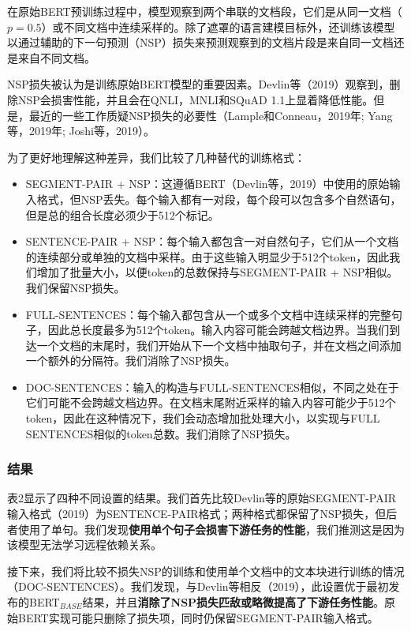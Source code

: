 \documentclass[lang=cn,11pt,a4paper,twocolumn]{elegantpaper}
\begin{document}
在原始BERT预训练过程中，模型观察到两个串联的文档段，它们是从同一文档（
$p = 0.5$）或不同文档中连续采样的。除了遮罩的语言建模目标外，还训练该模型以通过辅助的下一句预测（NSP）损失来预测观察到的文档片段是来自同一文档还是来自不同文档。

NSP损失被认为是训练原始BERT模型的重要因素。Devlin等（2019）观察到，删除NSP会损害性能，并且会在QNLI，MNLI和SQuAD 1.1上显着降低性能。但是，最近的一些工作质疑NSP损失的必要性（Lample和Conneau，2019年; Yang等，2019年; Joshi等，2019）。

为了更好地理解这种差异，我们比较了几种替代的训练格式：

\begin{itemize}
  \item SEGMENT-PAIR + NSP：这遵循BERT（Devlin等，2019）中使用的原始输入格式，但NSP丢失。每个输入都有一对段，每个段可以包含多个自然语句，但是总的组合长度必须少于512个标记。
  \item SENTENCE-PAIR + NSP：每个输入都包含一对自然句子，它们从一个文档的连续部分或单独的文档中采样。由于这些输入明显少于512个token，因此我们增加了批量大小，以便token的总数保持与SEGMENT-PAIR + NSP相似。我们保留NSP损失。
  \item FULL-SENTENCES：每个输入都包含从一个或多个文档中连续采样的完整句子，因此总长度最多为512个token。输入内容可能会跨越文档边界。当我们到达一个文档的末尾时，我们开始从下一个文档中抽取句子，并在文档之间添加一个额外的分隔符。我们消除了NSP损失。
  \item DOC-SENTENCES：输入的构造与FULL-SENTENCES相似，不同之处在于它们可能不会跨越文档边界。在文档末尾附近采样的输入内容可能少于512个token，因此在这种情况下，我们会动态增加批处理大小，以实现与FULL SENTENCES相似的token总数。我们消除了NSP损失。
\end{itemize}

\subsubsection*{结果}
表2显示了四种不同设置的结果。我们首先比较Devlin等的原始SEGMENT-PAIR输入格式（2019）为SENTENCE-PAIR格式；两种格式都保留了NSP损失，但后者使用了单句。我们发现\textbf{使用单个句子会损害下游任务的性能}，我们推测这是因为该模型无法学习远程依赖关系。

接下来，我们将比较不损失NSP的训练和使用单个文档中的文本块进行训练的情况（DOC-SENTENCES）。我们发现，与Devlin等相反（2019），此设置优于最初发布的BERT$_{BASE}$结果，并且\textbf{消除了NSP损失匹敌或略微提高了下游任务性能}。原始BERT实现可能只删除了损失项，同时仍保留SEGMENT-PAIR输入格式。
\end{document}
